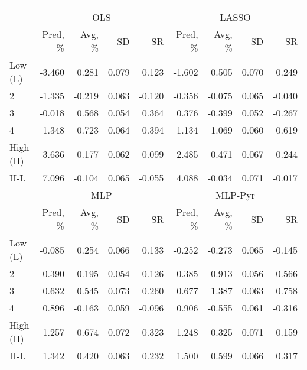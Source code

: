 \begin{tabular}{lrrrrrrrr}
\hline \hline \\ [-1.8ex]
 & \multicolumn{4}{c}{OLS} & \multicolumn{4}{c}{LASSO} \\
 \cmidrule(lr){2-5} \cmidrule(lr){6-9}
  & Pred, \% & Avg, \% & SD & SR & Pred, \% & Avg, \% & SD & SR \\
\midrule
Low (L) & -3.460 & 0.281 & 0.079 & 0.123 & -1.602 & 0.505 & 0.070 & 0.249 \\
2 & -1.335 & -0.219 & 0.063 & -0.120 & -0.356 & -0.075 & 0.065 & -0.040 \\
3 & -0.018 & 0.568 & 0.054 & 0.364 & 0.376 & -0.399 & 0.052 & -0.267 \\
4 & 1.348 & 0.723 & 0.064 & 0.394 & 1.134 & 1.069 & 0.060 & 0.619 \\
High (H) & 3.636 & 0.177 & 0.062 & 0.099 & 2.485 & 0.471 & 0.067 & 0.244 \\
H-L & 7.096 & -0.104 & 0.065 & -0.055 & 4.088 & -0.034 & 0.071 & -0.017 \\
\midrule
 & \multicolumn{4}{c}{MLP} & \multicolumn{4}{c}{MLP-Pyr} \\
 \cmidrule(lr){2-5} \cmidrule(lr){6-9}
  & Pred, \% & Avg, \% & SD & SR & Pred, \% & Avg, \% & SD & SR \\
\midrule
Low (L) & -0.085 & 0.254 & 0.066 & 0.133 & -0.252 & -0.273 & 0.065 & -0.145 \\
2 & 0.390 & 0.195 & 0.054 & 0.126 & 0.385 & 0.913 & 0.056 & 0.566 \\
3 & 0.632 & 0.545 & 0.073 & 0.260 & 0.677 & 1.387 & 0.063 & 0.758 \\
4 & 0.896 & -0.163 & 0.059 & -0.096 & 0.906 & -0.555 & 0.061 & -0.316 \\
High (H) & 1.257 & 0.674 & 0.072 & 0.323 & 1.248 & 0.325 & 0.071 & 0.159 \\
H-L & 1.342 & 0.420 & 0.063 & 0.232 & 1.500 & 0.599 & 0.066 & 0.317 \\
\hline \hline
\end{tabular}